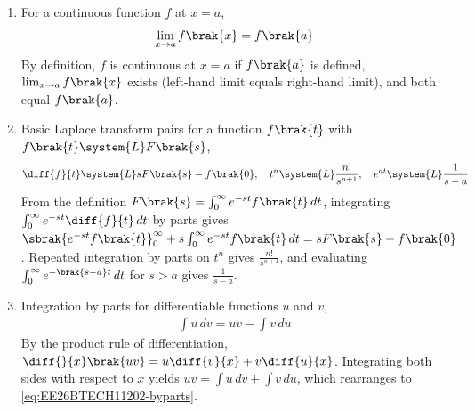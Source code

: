 \begin{enumerate}[label=\thesubsection.\arabic*, ref=\thesubsection.\theenumi]
\begin{align}
	\cot^{-1} : \mathbb{R} \to \brak{0, \pi}
	\label{eq:EE26BTECH11202-invtrig1}
	\\
	\sec^{-1} &: \mathbb{R}-\brak{-1,1} \to \sbrak{0,\pi} - \cbrak{\frac{\pi}{2}}, \quad
	\text{cosec}^{-1} : \mathbb{R}-\brak{-1,1} \to \sbrak{-\frac{\pi}{2}, \frac{\pi}{2}} - \cbrak{0}
	\label{eq:EE26BTECH11202-invtrig2}
\end{align}
\solution
Restricting $\tan x$ to $\brak{-\frac{\pi}{2}, \frac{\pi}{2}}$ and $\cot x$ to $\brak{0, \pi}$ makes them strictly monotonic and bijective onto $\mathbb{R}$. Restricting $\sec x$ to $\sbrak{0,\pi}-\cbrak{\frac{\pi}{2}}$ and $\text{cosec}\,x$ to $\sbrak{-\frac{\pi}{2}, \frac{\pi}{2}}-\cbrak{0}$ excludes the points where $\cos x = 0$ and $\sin x = 0$ respectively, ensuring bijectivity onto $\mathbb{R}-\brak{-1,1}$.
\item For a continuous function $f$ at $x = a$,
\begin{align}
	\lim_{x \to a} f\brak{x} = f\brak{a}
	\label{eq:EE26BTECH11202-cont}
\end{align}
\solution
By definition, $f$ is continuous at $x = a$ if $f\brak{a}$ is defined, $\lim_{x \to a} f\brak{x}$ exists (left-hand limit equals right-hand limit), and both equal $f\brak{a}$.
\item Basic Laplace transform pairs for a function $f\brak{t}$ with $f\brak{t} \system{L} F\brak{s}$,
\begin{align}
	\diff{f}{t} \system{L} sF\brak{s} - f\brak{0}, \quad
	t^n \system{L} \frac{n!}{s^{n+1}}, \quad
	e^{at} \system{L} \frac{1}{s-a}
	\label{eq:EE26BTECH11202-laplace}
\end{align}
\solution
From the definition $F\brak{s} = \int_0^{\infty} e^{-st} f\brak{t}\,dt$, integrating $\int_0^{\infty} e^{-st}\diff{f}{t}\,dt$ by parts gives $\sbrak{e^{-st}f\brak{t}}_0^{\infty} + s\int_0^{\infty} e^{-st}f\brak{t}\,dt = sF\brak{s} - f\brak{0}$. Repeated integration by parts on $t^n$ gives $\frac{n!}{s^{n+1}}$, and evaluating $\int_0^{\infty} e^{-\brak{s-a}t}\,dt$ for $s > a$ gives $\frac{1}{s-a}$.
\item Integration by parts for differentiable functions $u$ and $v$,
\begin{align}
	\int u\,dv = uv - \int v\,du
	\label{eq:EE26BTECH11202-byparts}
\end{align}
\solution
By the product rule of differentiation, $\diff{}{x}\brak{uv} = u\diff{v}{x} + v\diff{u}{x}$. Integrating both sides with respect to $x$ yields $uv = \int u\,dv + \int v\,du$, which rearranges to \eqref{eq:EE26BTECH11202-byparts}.
\end{enumerate}
